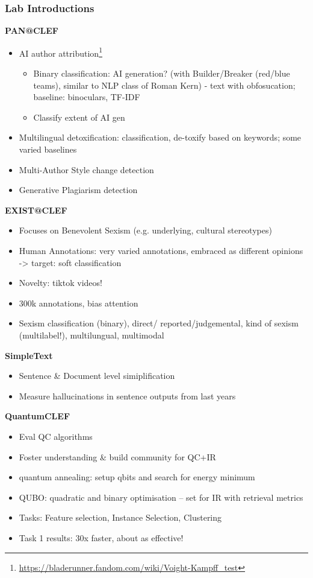 \documentclass[a4paper]{article}
\begin{document}
\subsubsection{Lab Introductions}
\textbf{PAN@CLEF}
\begin{itemize}
    \item AI author attribution\footnote{\url{https://bladerunner.fandom.com/wiki/Voight-Kampff_test}}
          \begin{itemize}
              \item Binary classification: AI generation? (with Builder/Breaker (red/blue teams), similar to NLP class of Roman Kern) - text with obfosucation; baseline: binoculars, TF-IDF
              \item Classify extent of AI gen
          \end{itemize}
    \item Multilingual detoxification: classification, de-toxify based on keywords; some varied baselines
    \item Multi-Author Style change detection
    \item Generative Plagiarism detection
\end{itemize}
\textbf{EXIST@CLEF}
\begin{itemize}
    \item Focuses on Benevolent Sexism (e.g. underlying, cultural stereotypes)
    \item Human Annotations: very varied annotations, embraced  as different opinions -> target: soft classification
    \item Novelty: tiktok videos!
    \item 300k annotations, bias attention
    \item Sexism classification (binary), direct/ reported/judgemental, kind of sexism (multilabel!), multilungual, multimodal
\end{itemize}
\textbf{SimpleText}
\begin{itemize}
    \item Sentence \& Document level simiplification
    \item Measure hallucinations in sentence outputs from last years
\end{itemize}
\textbf{QuantumCLEF}
\begin{itemize}
    \item Eval QC algorithms
    \item Foster understanding \& build community for QC+IR
    \item quantum annealing: setup qbits and search for energy minimum
    \item QUBO: quadratic and binary optimisation -- set for IR with retrieval metrics
    \item Tasks: Feature selection, Instance Selection, Clustering
    \item Task 1 results: 30x faster, about as effective!
\end{itemize}
\end{document}
